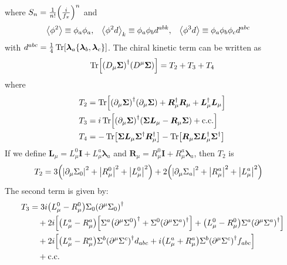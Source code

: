 where \(S_{n} = \frac{1}{n!}\qty(\frac{i}{f_{\pi}})^{n}\) and
\begin{align}
    \expval{\phi^{2}}
     & \equiv
    \phi_{a}\phi_{a},
     &
    \expval{\phi^{2}d}_{k}
     & \equiv
    \phi_{a}\phi_{b}d^{abk},
     &
    \expval{\phi^{3}d}
     & \equiv
    \phi_{a}\phi_{b}\phi_{c}d^{abc}
\end{align}
with \(d^{abc} = \frac{1}{4}\Tr[\bm{\lambda}_{a}\acomm{\bm{\lambda}_{b}}{\bm{\lambda}_{c}}]\).
The chiral kinetic term can be written as
\begin{align}
    \Tr[
        \qty(D_{\mu}\bm{\Sigma})^{\dagger}
        \qty(D^{\mu}\bm{\Sigma})
    ] = T_{2} + T_{3} + T_{4}
\end{align}
where
\begin{align}
    T_{2} & = \Tr[
        \qty(\partial_{\mu}\bm{\Sigma})^{\dagger}
        \qty(\partial_{\mu}\bm{\Sigma})
        + \bm{R}^{\dagger}_{\mu}\bm{R}_{\mu}
        + \bm{L}^{\dagger}_{\mu}\bm{L}_{\mu}
    ]               \\
    T_{3} & = i\Tr[
        \qty(\partial_{\mu}\bm{\Sigma})^{\dagger}
        \qty(
        \bm{\Sigma}\bm{L}_{\mu} -
        \bm{R}_{\mu}\bm{\Sigma}
        ) + \mathrm{c.c.}
    ]               \\
    T_{4} & = -\Tr[
        \bm{\Sigma}
        \bm{L}_{\mu}
        \bm{\Sigma}^{\dagger}
        \bm{R}^{\dagger}_{\mu}
    ]-\Tr[
        \bm{R}_{\mu}
        \bm{\Sigma}
        \bm{L}^{\dagger}_{\mu}
        \bm{\Sigma}^{\dagger}
    ]
\end{align}
If we define
\(\bm{L}_{\mu} = L_{\mu}^{0}\bm{I} + L^{a}_{\mu}\bm{\lambda}_{a}\) and
\(\bm{R}_{\mu} = R_{\mu}^{0}\bm{I} + R^{a}_{\mu}\bm{\lambda}_{a}\), then
\(T_{2}\) is
\begin{align}
    T_{2} & =
    3\qty(\qty|\partial_{\mu}\Sigma_{0}|^{2} + \qty|R^{0}_{\mu}|^{2} + \qty|L^{0}_{\mu}|^{2})
    +
    2\qty(\qty|\partial_{\mu}\Sigma_{a}|^{2} + \qty|R^{a}_{\mu}|^{2}+ \qty|L^{a}_{\mu}|^{2})
\end{align}
The second term is given by:
\begin{align}
    T_{3}
     & =
    3i\qty(L^{0}_{\mu}-R^{0}_{\mu})\Sigma_{0}\qty(\partial^{\mu}\Sigma_{0})^{\dagger} \\
     & \quad
    + 2i\qty[
        \qty(L^{a}_{\mu}-R^{a}_{\mu})
        \qty[
            \Sigma^{a}\qty(\partial^{\mu}\Sigma^{0})^{\dagger} +
            \Sigma^{0}\qty(\partial^{\mu}\Sigma^{a})^{\dagger}
        ] +
        \qty(L^{0}_{\mu}-R^{0}_{\mu})\Sigma^{a}\qty(\partial^{\mu}\Sigma^{a})^{\dagger}
    ]\notag                                                                           \\
     & \quad
    +2i\qty[
    \qty(L^{a}_{\mu}-R^{a}_{\mu})\Sigma^{b}\qty(\partial^{\mu}\Sigma^{c})^{\dagger}d_{abc} +
    i\qty(L^{a}_{\mu}+R^{a}_{\mu})\Sigma^{b}\qty(\partial^{\mu}\Sigma^{c})^{\dagger}f_{abc}
    ]\notag                                                                           \\
     & \quad
    + \mathrm{c.c.}\notag
\end{align}
